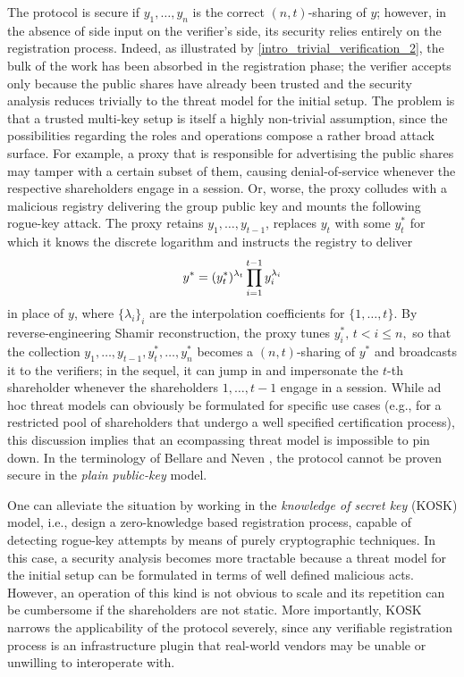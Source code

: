 \documentclass{iacrtrans}
\begin{document}
\noindent
The protocol is secure
if $y_1, \dots, y_n$ is the correct $(n, t)$-sharing of $y$;
however, in the absence of side input
on the verifier's side,
its security relies entirely on the registration process.
Indeed, as illustrated by \eqref{intro_trivial_verification_2},
the bulk of the work has been
absorbed in the registration phase;
the verifier accepts only because
the public shares have already been trusted
and the security analysis
reduces trivially to the threat model for the initial setup.
The problem is that
a trusted multi-key setup is itself
a highly non-trivial assumption,
since the possibilities regarding
the roles and operations
compose a rather broad attack surface.
For example, a proxy that is responsible
for advertising the public shares
may tamper with a certain subset of them,
causing denial-of-service whenever
the respective shareholders engage
in a session.
Or, worse, the proxy colludes with
a malicious registry delivering the group public key
and mounts the following rogue-key attack.
The proxy retains $y_1, \dots, y_{t-1}$, replaces
$y_t$ with some $y_t^*$ for which it knows the discrete logarithm
and instructs the registry to deliver
\vspace{5pt}
\begin{equation*}
y^* = (y_t^*)^{\lambda_t}\prod_{i=1}^{t-1}y_i^{\lambda_i}
\vspace{5pt}
\end{equation*}
in place of $y$, where $\{\lambda_i\}_{i}$
are the interpolation coefficients for $\{1, \dots, t\}$.
By reverse-engineering Shamir reconstruction,
the proxy tunes $y_i^*,\hspace{2pt} t < i \le n,$
so that the collection $y_1, \dots, y_{t-1}, y_t^*, \dots, y_n^*$
becomes a $(n, t)$-sharing of $y^*$
and broadcasts it to the verifiers;
in the sequel, it can jump in and
impersonate the $t$-th shareholder
whenever the shareholders $1, \dots, t-1$ engage
in a session.
While ad hoc threat models can obviously be formulated
for specific use cases (e.g., for a restricted pool of
shareholders that undergo a well specified certification process),
this discussion implies that
an ecompassing threat model is impossible to pin down.
In the terminology of Bellare and Neven \cite{paper_bellare_musig},
the protocol cannot be proven secure
in the \textit{plain public-key} model.

One can alleviate the situation by working in the
\textit{knowledge of secret key} (KOSK) model,
i.e., design a zero-knowledge based registration process,
capable of detecting rogue-key attempts
by means of purely cryptographic techniques.
In this case, a security analysis becomes more tractable
because a threat model for the initial setup can be
formulated in terms of well defined malicious acts.
However, an operation of this kind is not obvious to scale
and its repetition can be cumbersome
if the shareholders are not static.
More importantly, KOSK narrows
the applicability of the protocol severely,
since any verifiable registration process
is an infrastructure plugin that real-world vendors
may be unable or unwilling to interoperate with.
\end{document}
